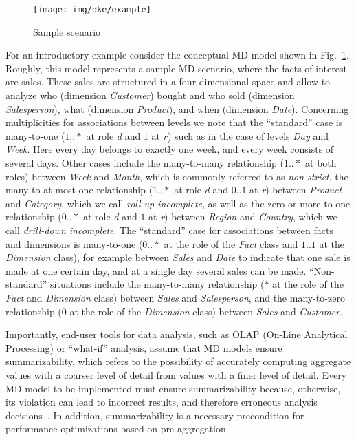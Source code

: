 \begin{figure}
  \begin{center}
    \texttt{[image: img/dke/example]}
  \end{center}
  \caption{Sample scenario} \label{a1:fig:sample}
\end{figure}

For an introductory example consider the conceptual MD model shown
in Fig.~\ref{a1:fig:sample}. Roughly, this model represents a sample
MD scenario, where the facts of interest are sales.  These sales are
structured in a four-dimensional space and allow to analyze who
(dimension \textit{Customer}) bought and who sold (dimension
\textit{Salesperson}), what (dimension \textit{Product}), and when
(dimension \textit{Date}). Concerning multiplicities for
associations between levels we note that the ``standard'' case is
many-to-one ($1..*$ at role \emph{d} and $1$ at $r$) such as in the
case of levels \textit{Day} and \textit{Week}.  Here every day
belongs to exactly one week, and every week consists of several
days. Other cases include the many-to-many relationship ($1..*$ at
both roles) between \textit{Week} and \textit{Month}, which is
commonly referred to as \emph{non-strict}, the many-to-at-most-one
relationship ($1..*$ at role \emph{d} and $0..1$ at \emph{r})
between \textit{Product} and \textit{Category}, which we call
\emph{roll-up incomplete}, as well as the zero-or-more-to-one
relationship ($0..*$ at role \emph{d} and $1$ at \emph{r}) between
\textit{Region} and \textit{Country}, which we call \emph{drill-down
incomplete}. The ``standard'' case for associations between facts
and dimensions is many-to-one ($0..*$ at the role of the \emph{Fact}
class and $1..1$ at the \emph{Dimension} class), for example between
\emph{Sales} and \emph{Date} to indicate that one sale is made at
one certain day, and at a single day several sales can be made.
``Non-standard'' situations include the many-to-many relationship
($*$ at the role of the \emph{Fact} and \emph{Dimension} class)
between \emph{Sales} and \emph{Salesperson}, and the many-to-zero
relationship ($0$ at the role of the \emph{Dimension} class) between
\emph{Sales} and \emph{Customer}.

Importantly, end-user tools for data analysis, such as OLAP (On-Line
Analytical Processing) or ``what-if'' analysis, assume that MD
models ensure summarizability, which refers to the possibility of
accurately computing aggregate values with a coarser level of detail
from values with a finer level of detail. Every MD model to be
implemented must ensure summarizability because, otherwise, its
violation can lead to incorrect results, and therefore erroneous
analysis
decisions~\cite{DBLP:conf/ssdbm/LehnerAW98,DBLP:conf/ssdbm/LenzS97}.
In addition, summarizability is a necessary precondition for
performance optimizations based on
pre-aggregation~\cite{DBLP:conf/vldb/PedersenJD99}.

